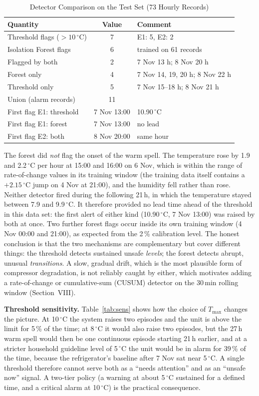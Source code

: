 \documentclass[conference]{IEEEtran}
\newcommand{\degC}{\ensuremath{^{\circ}}C}
\newcommand{\Tmax}{\ensuremath{T_{\max}}}
\begin{document}
\begin{table}[t]
\caption{Detector Comparison on the Test Set (73 Hourly Records)}
\label{tab:replay}
\centering
\footnotesize
\begin{tabular}{p{}cp{}}
\toprule
Quantity & Value & Comment \\
\midrule
Threshold flags ($>10$\,\degC) & 7 & E1: 5, E2: 2 \\
Isolation Forest flags & 6 & trained on 61 records \\
Flagged by both & 2 & 7 Nov 13 h; 8 Nov 20 h \\
Forest only & 4 & 7 Nov 14, 19, 20 h; 8 Nov 22 h \\
Threshold only & 5 & 7 Nov 15--18 h; 8 Nov 21 h \\
Union (alarm records) & 11 & \\
First flag E1: threshold & 7 Nov 13:00 & 10.90\,\degC \\
First flag E1: forest & 7 Nov 13:00 & no lead \\
First flag E2: both & 8 Nov 20:00 & same hour \\
\bottomrule
\end{tabular}
\end{table}

The forest did \emph{not} flag the onset of the warm spell. The temperature rose by 1.9 and 2.2\,\degC{} per hour at 15:00 and 16:00 on 6 Nov, which is within the range of rate-of-change values in its training window (the training data itself contains a $+2.15$\,\degC{} jump on 4 Nov at 21:00), and the humidity fell rather than rose. Neither detector fired during the following 21\,h, in which the temperature stayed between 7.9 and 9.9\,\degC. It therefore provided no lead time ahead of the threshold in this data set: the first alert of either kind (10.90\,\degC, 7 Nov 13:00) was raised by both at once. Two further forest flags occur inside its own training window (4 Nov 00:00 and 21:00), as expected from the 2\,\% calibration level. The honest conclusion is that the two mechanisms are complementary but cover different things: the threshold detects sustained unsafe \emph{levels}; the forest detects abrupt, unusual \emph{transitions}. A slow, gradual drift, which is the most plausible form of compressor degradation, is not reliably caught by either, which motivates adding a rate-of-change or cumulative-sum (CUSUM) detector on the 30\,min rolling window (Section~VIII).

\textbf{Threshold sensitivity.} Table~\ref{tab:sens} shows how the choice of \Tmax{} changes the picture. At 10\,\degC{} the system raises two episodes and the unit is above the limit for 5\,\% of the time; at 8\,\degC{} it would also raise two episodes, but the 27\,h warm spell would then be one continuous episode starting 21\,h earlier, and at a stricter household guideline level of 5\,\degC{} the unit would be in alarm for 39\,\% of the time, because the refrigerator's baseline after 7 Nov sat near 5\,\degC. A single threshold therefore cannot serve both as a ``needs attention'' and as an ``unsafe now'' signal. A two-tier policy (a warning at about 5\,\degC{} sustained for a defined time, and a critical alarm at 10\,\degC) is the practical consequence.
\end{document}

